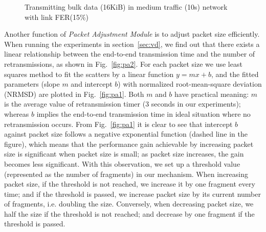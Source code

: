 \documentclass[runningheads,a4paper]{llncs}
\begin{document}
\begin{figure}
	\vspace{-15pt}
	\centering
	\caption{Transmitting bulk data (16KiB) in medium traffic (10s) network with link FER(15\%)}
	\label{fig:pa}
	\vspace{-15pt}
\end{figure}

Another function of \emph{Packet Adjustment Module} is to adjust packet size efficiently. When running the experiments in section~\ref{sec:vd}, we find out that there exists a linear relationship between the end-to-end transmission time and the number of retransmissions, as shown in Fig.~\ref{fig:pa2}. For each packet size we use least squares method to fit the scatters by a linear function $y=mx+b$, and the fitted parameters (slope $m$ and intercept $b$) with normalized root-mean-square deviation (NRMSD) are plotted in Fig.~\ref{fig:pa1}. Both $m$ and $b$ have practical meaning: $m$ is the average value of retransmission timer (3 seconds in our experiments); whereas $b$ implies the end-to-end transmission time in ideal situation where no retransmission occurs. From Fig.~\ref{fig:pa1} it is clear to see that intercept $b$ against packet size follows a negative exponential function (dashed line in the figure), which means that the performance gain achievable by increasing packet size is significant when packet size is small; as packet size increases, the gain becomes less significant. With this observation, we set up a threshold value (represented as the number of fragments) in our mechanism. When increasing packet size, if the threshold is not reached, we increase it by one fragment every time; and if the threshold is passed, we increase packet size by its current number of fragments, i.e. doubling the size. Conversely, when decreasing packet size, we half the size if the threshold is not reached; and decrease by one fragment if the threshold is passed.
\end{document}

